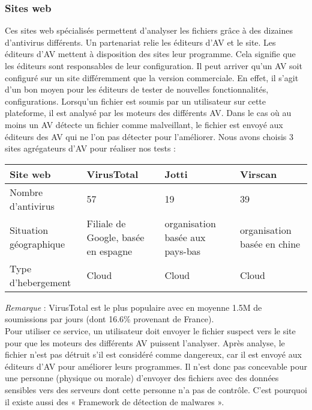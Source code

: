 \documentclass[smallextended]{svjour3}       %
\begin{document}
\subsubsection{Sites web}
\label{2.2.1sites}
Ces sites web spécialisés permettent d'analyser les fichiers grâce à des dizaines d'antivirus différents. Un partenariat relie les éditeurs d'AV et le site. Les éditeurs d'AV mettent à disposition des sites leur programme. Cela signifie que les éditeurs sont responsables de leur configuration. Il peut arriver qu'un AV soit configuré sur un site différemment que la version commerciale. En effet, il s'agit d'un bon moyen pour les éditeurs de tester de nouvelles fonctionnalités, configurations. Lorsqu'un fichier est soumis par un utilisateur sur cette plateforme, il est analysé par les moteurs des différents AV. Dans le cas où au moins un AV détecte un fichier comme malveillant, le fichier est envoyé aux éditeurs des AV qui ne l'on pas détecter pour l'améliorer. Nous avons choisis 3 sites agrégateurs d'AV pour réaliser nos tests :\\
\begin{tabular}{|l|p{3cm}|p{3cm}|p{3cm}|}
  \hline
   \textbf{Site web} & \textbf{VirusTotal} & \textbf{Jotti} & \textbf{Virscan} \\
   \hline
  Nombre d'antivirus & 57 & 19 & 39\\
  \hline
  Situation géographique & Filiale de Google, basée en espagne & organisation basée aux pays-bas & organisation basée en chine\\
  \hline
  Type d'hebergement & Cloud & Cloud & Cloud\\
  \hline
\end{tabular}
$ $\\
\textit{Remarque} : VirusTotal est le plus populaire avec en moyenne 1.5M de soumissions par jours (dont 16.6\% provenant de France).\\
$ $\\
Pour utiliser ce service, un utilisateur doit envoyer le fichier suspect vers le site pour que les moteurs des différents AV puissent l'analyser. Après analyse, le fichier n'est pas détruit s'il est considéré comme dangereux, car il est envoyé aux éditeurs d'AV pour améliorer leurs programmes. Il n'est donc pas concevable pour une personne (physique ou morale) d'envoyer des fichiers avec des données sensibles vers des serveurs dont cette personne n'a pas de contrôle. C'est pourquoi il existe aussi des « Framework de détection de malwares ».
\end{document}
